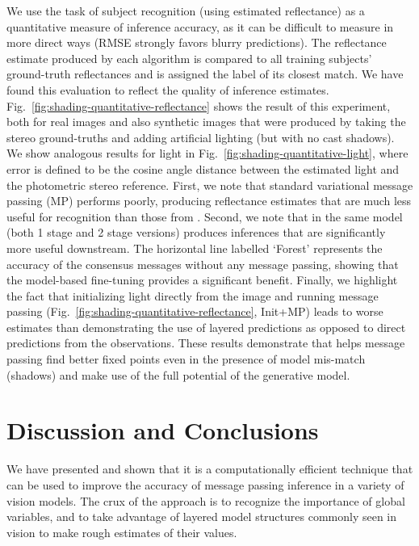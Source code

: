 We use the task of subject recognition (using estimated reflectance) as a quantitative measure of inference accuracy, as it can be difficult to measure in more direct ways (\eg RMSE strongly favors blurry predictions). The reflectance estimate produced by each algorithm is compared to all training subjects' ground-truth reflectances and is assigned the label of its closest match. We have found this evaluation to reflect the quality of inference estimates. Fig.~\ref{fig:shading-quantitative-reflectance} shows the result of this experiment, both for real images and also synthetic images that were produced by taking the stereo ground-truths and adding artificial lighting (but with no cast shadows). We show analogous results for light in Fig.~\ref{fig:shading-quantitative-light}, where error is defined to be the cosine angle distance between the estimated light and the photometric stereo reference. First, we note that standard variational message passing (MP) performs poorly, producing reflectance estimates that are much less useful for recognition than those from \cite{Biswas2009}. Second, we note that \MTD in the same model (both 1 stage and 2 stage versions) produces inferences that are significantly more useful downstream. The horizontal line labelled `Forest' represents the accuracy of the consensus messages without any message passing, showing that the model-based fine-tuning provides a significant benefit. Finally, we highlight the fact that initializing light directly from the image and running message passing (Fig.~\ref{fig:shading-quantitative-reflectance}, Init+MP) leads to worse estimates than \MTD demonstrating the use of layered predictions as opposed to direct predictions from the observations. These results demonstrate that \MTD helps message passing find better fixed points even in the presence of model mis-match (shadows) and make use of the full potential of the generative model.

\section{Discussion and Conclusions}
\label{sec:discussion-chap4}

We have presented \METHOD and shown that it is a computationally efficient technique that can be used to improve the accuracy of message passing inference in a variety of vision models. The crux of the approach is to recognize the importance of global variables, and to take advantage of layered model structures commonly seen in vision to make rough estimates of their values.

